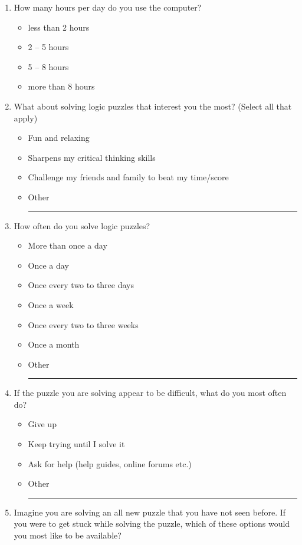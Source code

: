 \begin{enumerate}[topsep=-4em]
\item How many hours per day do you use the computer?
\begin{itemize}[topsep=-6em, label={o}]
\itemsep-1em 
\item less than 2 hours
\item 2 -- 5 hours
\item 5 -- 8 hours
\item more than 8 hours
\end{itemize}
\item What about solving logic puzzles that interest you the most? (Select all that apply)
\begin{itemize}[topsep=-6em, label={o}]
\itemsep-1em 
\item Fun and relaxing
\item Sharpens my critical thinking skills
\item Challenge my friends and family to beat my time/score
\item Other \rule{4cm}{0.4pt}
\end{itemize}
\item How often do you solve logic puzzles?
\begin{itemize}[topsep=-6em, label={o}]
\itemsep-1em 
\item More than once a day
\item Once a day
\item Once every two to three days
\item Once a week
\item Once every two to three weeks
\item Once a month
\item Other \rule{4cm}{0.4pt}
\end{itemize}
\item If the puzzle you are solving appear to be difficult, what do you most often do?
\begin{itemize}[topsep=-6em, label={o}]
\itemsep-1em 
\item Give up
\item Keep trying until I solve it
\item Ask for help (help guides, online forums etc.)
\item Other \rule{4cm}{0.4pt}
\end{itemize}
\item Imagine you are solving an all new puzzle that you have not seen before. If you were to get stuck while solving the puzzle, which of these options would you most like to be available?
\begin{itemize}[topsep=-6em, label={o}]

\end{itemize}
\end{enumerate}
